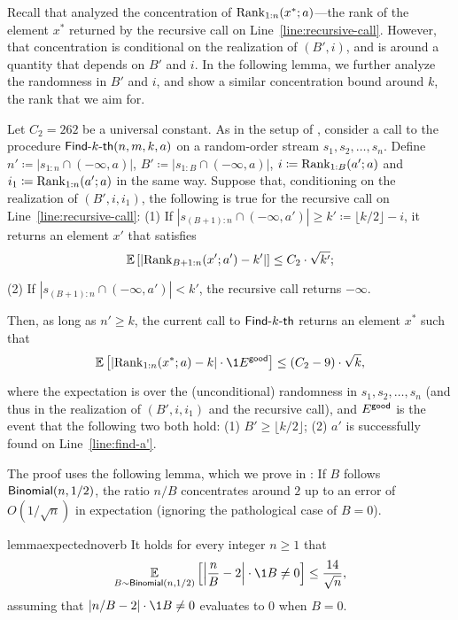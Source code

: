 Recall that  analyzed the concentration of $\mathrm{Rank}_{1:n}(x^*; a)$---the rank of the element $x^*$ returned by the recursive call on Line~\ref{line:recursive-call}. However, that concentration is conditional on the realization of $(B', i)$, and is around a quantity that depends on $B'$ and $i$. In the following lemma, we further analyze the randomness in $B'$ and $i$, and show a similar concentration bound around $k$, the rank that we aim for.

\begin{lemma}\label{lemma:inductive-step}
    Let $C_2 = 262$ be a universal constant. As in the setup of , consider a call to the procedure $\textsf{Find-}k\textsf{-th}(n, m, k, a)$ on a random-order stream $s_1, s_2, \ldots, s_n$. Define $n' \coloneqq |s_{1:n} \cap (-\infty, a)|$, $B' \coloneqq |s_{1:B} \cap (-\infty, a)|$, $i \coloneqq \mathrm{Rank}_{1:B}(a'; a)$ and $i_1 \coloneqq \mathrm{Rank}_{1:n}(a'; a)$ in the same way. Suppose that, conditioning on the realization of $(B', i, i_1)$, the following is true for the recursive call on Line~\ref{line:recursive-call}: (1) If $|s_{(B+1):n} \cap (-\infty, a')| \ge k' \coloneqq \lfloor k/2 \rfloor - i$, it returns an element $x'$ that satisfies
    \[
        \operatorname*{\mathbb{E}}_{}\left[\left|\mathrm{Rank}_{B+1:n}(x'; a') - k'\right|\right] \le C_2 \cdot \sqrt{k'};
    \]
    (2) If $|s_{(B+1):n} \cap (-\infty, a')| < k'$, the recursive call returns $-\infty$.
    
    Then, as long as $n' \ge k$, the current call to $\textsf{Find-}k\textsf{-th}$ returns an element $x^*$ such that
    \[
        \Ex{}{\left|\rank_{{1:n}}(x^*; a) - k\right|\cdot \1{\goodevent}} \le (C_2-9)\cdot \sqrt{k},
    \]
    where the expectation is over the (unconditional) randomness in $s_1, s_2, \ldots, s_n$ (and thus in the realization of $(B', i, i_1)$ and the recursive call), and $E^{\textsf{good}}$ is the event that the following two both hold: (1) $B' \ge \lfloor k/2\rfloor$; (2) $a'$ is successfully found on Line~\ref{line:find-a'}.
\end{lemma}

The proof uses the following lemma, which we prove in : If $B$ follows $\mathsf{Binomial}(n, 1/2)$, the ratio $n/B$ concentrates around $2$ up to an error of $O(1/\sqrt{n})$ in expectation (ignoring the pathological case of $B = 0$).
\begin{restatable}{lemma}{expectednoverb}\label{lemma.integral1}
    It holds for every integer $n \ge 1$ that
    \[
        \Ex{B \sim \Binomial(n, 1/2)}{\left|\frac{n}{B} - 2\right|\cdot\1{B \ne 0}}  \le \frac{14}{\sqrt{n}},
    \]
    assuming that $\left|n/B - 2\right|\cdot\1{B \ne 0}$ evaluates to $0$ when $B = 0$.
\end{restatable}

